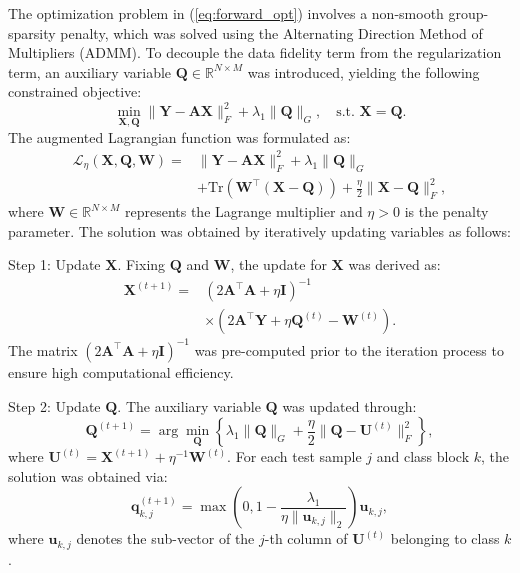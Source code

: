 \documentclass[10pt,comsoc]{IEEEtran}
\begin{document}
The optimization problem in (\ref{eq:forward_opt}) involves a non-smooth group-sparsity penalty, which was solved using the Alternating Direction Method of Multipliers (ADMM). To decouple the data fidelity term from the regularization term, an auxiliary variable $\mathbf{Q} \in \mathbb{R}^{N \times M}$ was introduced, yielding the following constrained objective:
\begin{equation}
\min_{\mathbf{X}, \mathbf{Q}} \|\mathbf{Y} - \mathbf{AX}\|_F^2 + \lambda_1 \|\mathbf{Q}\|_G, \quad \text{s.t. } \mathbf{X} = \mathbf{Q}.
\end{equation}
The augmented Lagrangian function was formulated as:
\begin{equation}
\begin{split}
\mathcal{L}_\eta (\mathbf{X}, \mathbf{Q}, \mathbf{W}) = & \|\mathbf{Y} - \mathbf{AX}\|_F^2 + \lambda_1 \|\mathbf{Q}\|_G \\
& + \text{Tr}(\mathbf{W}^\top (\mathbf{X} - \mathbf{Q})) + \frac{\eta}{2} \|\mathbf{X} - \mathbf{Q}\|_F^2,
\end{split}
\end{equation}
where $\mathbf{W} \in \mathbb{R}^{N \times M}$ represents the Lagrange multiplier and $\eta > 0$ is the penalty parameter. The solution was obtained by iteratively updating variables as follows:

Step 1: Update $\mathbf{X}$. Fixing $\mathbf{Q}$ and $\mathbf{W}$, the update for $\mathbf{X}$ was derived as:
\begin{equation}
\begin{split}
\mathbf{X}^{(t+1)} = & (2\mathbf{A}^\top\mathbf{A} + \eta \mathbf{I})^{-1} \\
& \times (2\mathbf{A}^\top\mathbf{Y} + \eta \mathbf{Q}^{(t)} - \mathbf{W}^{(t)}).
\end{split}
\end{equation}
The matrix $(2\mathbf{A}^\top\mathbf{A} + \eta \mathbf{I})^{-1}$ was pre-computed prior to the iteration process to ensure high computational efficiency.

Step 2: Update $\mathbf{Q}$. The auxiliary variable $\mathbf{Q}$ was updated through:
\begin{equation}
\mathbf{Q}^{(t+1)} = \arg\min_{\mathbf{Q}} \left\{ \lambda_1 \|\mathbf{Q}\|_G + \frac{\eta}{2} \|\mathbf{Q} - \mathbf{U}^{(t)}\|_F^2 \right\},
\end{equation}
where $\mathbf{U}^{(t)} = \mathbf{X}^{(t+1)} + \eta^{-1}\mathbf{W}^{(t)}$. For each test sample $j$ and class block $k$, the solution was obtained via:
\begin{equation}
\mathbf{q}_{k,j}^{(t+1)} = \max \left( 0, 1 - \frac{\lambda_1}{\eta \|\mathbf{u}_{k,j}\|_2} \right) \mathbf{u}_{k,j},
\end{equation}
where $\mathbf{u}_{k,j}$ denotes the sub-vector of the $j$-th column of $\mathbf{U}^{(t)}$ belonging to class $k$.
\end{document}
